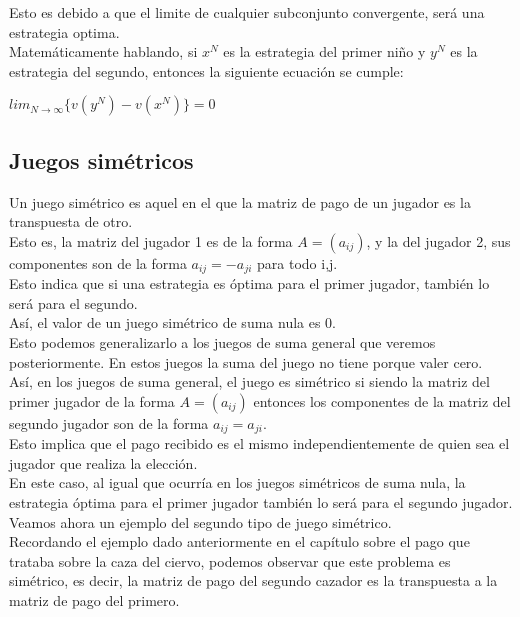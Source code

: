 \documentclass[10pt,a4paper]{book}
\begin{document}
Esto es debido a que el limite de cualquier subconjunto convergente, será una estrategia optima.\\
Matemáticamente hablando, si $x^{N}$ es la estrategia del primer niño y $y^{N}$ es la estrategia del segundo, entonces la siguiente ecuación se cumple:

\begin{center}

$lim_{N \longrightarrow \infty}\{v(y^{N})-v(x^{N})\}=0$

\end{center}

\subsection{Juegos simétricos}

Un juego simétrico es aquel en el que la matriz de pago de un jugador es la transpuesta de otro.\\
Esto es, la matriz del jugador 1 es de la forma $A=(a_{ij})$, y la del jugador 2, sus componentes son de la forma $a_{ij}=-a_{ji}$ para todo i,j.\\

Esto indica que si una estrategia es óptima para el primer jugador, también lo será para el segundo.\\
Así, el valor de un juego simétrico de suma nula es 0.\\

Esto podemos generalizarlo a los juegos de suma general que veremos posteriormente. En estos juegos la suma del juego no tiene porque valer cero.\\
Así, en los juegos de suma general, el juego es simétrico si siendo la matriz del primer jugador de la forma $A=(a_{ij})$ entonces los componentes de la matriz del segundo jugador son de la forma $a_{ij}=a_{ji}$.\\

Esto implica que el pago recibido es el mismo independientemente de quien sea el jugador que realiza la elección. \\

En este caso, al igual que ocurría en los juegos simétricos de suma nula, la estrategia óptima para el primer jugador también lo será para el segundo jugador.\\

Veamos ahora un ejemplo del segundo tipo de juego simétrico.\\

Recordando el ejemplo dado anteriormente en el capítulo sobre el pago que trataba sobre la caza del ciervo, podemos observar que este problema es simétrico, es decir, la matriz de pago del segundo cazador es la transpuesta a la matriz de pago del primero.\\
\end{document}
